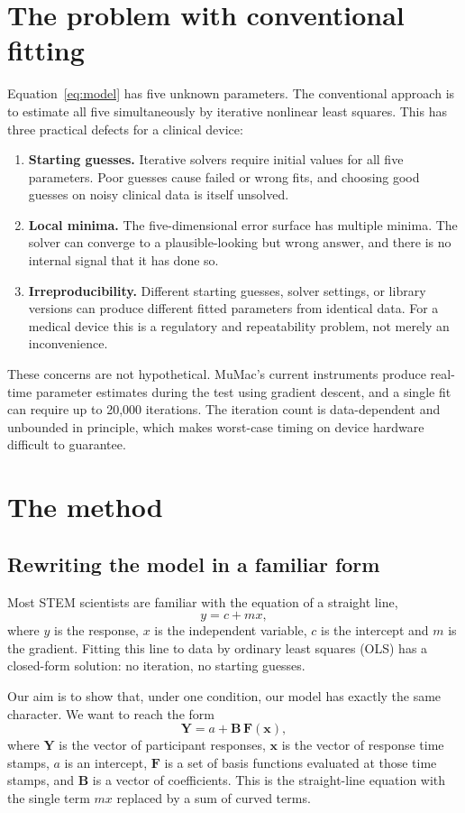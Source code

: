 \documentclass[11pt,a4paper]{article}
\begin{document}
\section{The problem with conventional fitting}
Equation~\eqref{eq:model} has five unknown parameters. The conventional
approach is to estimate all five simultaneously by iterative nonlinear
least squares. This has three practical defects for a clinical device:
\begin{enumerate}[nosep]
\item \textbf{Starting guesses.} Iterative solvers require initial values
  for all five parameters. Poor guesses cause failed or wrong fits, and
  choosing good guesses on noisy clinical data is itself unsolved.
\item \textbf{Local minima.} The five-dimensional error surface has
  multiple minima. The solver can converge to a plausible-looking but
  wrong answer, and there is no internal signal that it has done so.
\item \textbf{Irreproducibility.} Different starting guesses, solver
  settings, or library versions can produce different fitted parameters
  from identical data. For a medical device this is a regulatory and
  repeatability problem, not merely an inconvenience.
\end{enumerate}
These concerns are not hypothetical. MuMac's current instruments produce
real-time parameter estimates during the test using gradient descent, and
a single fit can require up to 20{,}000 iterations. The iteration count
is data-dependent and unbounded in principle, which makes worst-case
timing on device hardware difficult to guarantee.

\section{The method}
\subsection{Rewriting the model in a familiar form}
Most STEM scientists are familiar with the equation of a straight line,
\begin{equation}
y = c + mx,
\end{equation}
where $y$ is the response, $x$ is the independent variable, $c$ is the
intercept and $m$ is the gradient. Fitting this line to data by ordinary
least squares (OLS) has a closed-form solution: no iteration, no starting
guesses.

Our aim is to show that, under one condition, our model has exactly the
same character. We want to reach the form
\begin{equation}
\mathbf{Y} = a + \mathbf{B}\,\mathbf{F}(\mathbf{x}),
\end{equation}
where $\mathbf{Y}$ is the vector of participant responses, $\mathbf{x}$ is
the vector of response time stamps, $a$ is an intercept, $\mathbf{F}$ is a
set of basis functions evaluated at those time stamps, and $\mathbf{B}$ is
a vector of coefficients. This is the straight-line equation with the
single term $mx$ replaced by a sum of curved terms.
\end{document}
